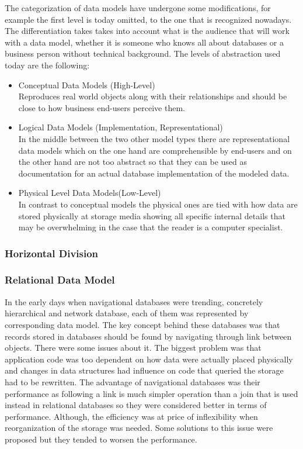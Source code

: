 The categorization of data models have undergone some modifications, for example the first level is today omitted, to the one that is recognized nowadays. The differentiation takes takes into account  what is the audience that will work with a data model, whether it is someone who knows all about databases or a business person without technical background. The levels of abstraction used today\cite{SilberschatzKorthSudarshan10} are the following: 
\begin{itemize}
	\item Conceptual Data Models (High-Level) \\
	Reproduces real world objects along with their relationships and should be close to how business end-users perceive them.
	
	\item Logical Data Models (Implementation, Representational) \\
	In the middle between the two other model types there are representational data models which on the one hand are comprehensible by end-users and on the other hand are not too abstract so that they can be used as documentation for an actual database implementation of the modeled data.
	
	\item Physical Level Data Models(Low-Level) \\
	In contrast to conceptual models the physical ones are tied with how data are stored physically at storage media showing all specific internal details that may be overwhelming in the case that the reader is a computer specialist.
\end{itemize}


\subsubsection{Horizontal Division}

\subsubsection{Relational Data Model}

In the early days when navigational databases were trending, concretely hierarchical and network database, each of them was represented by corresponding data model. 
The key concept behind these databases was that records stored in databases should be found by navigating through link between objects. 
There were some issues about it. The biggest problem was that application code was too dependent on how data were actually placed physically and changes in data structures had influence on code that queried the storage had to be rewritten.
The advantage of navigational databases was their performance as following a link is much simpler operation than a join that is used instead in relational databases so they were considered better in terms of performance. Although, the efficiency was at price of inflexibility when reorganization of the storage was needed. Some solutions to this issue were proposed but they tended to worsen the performance.\\

